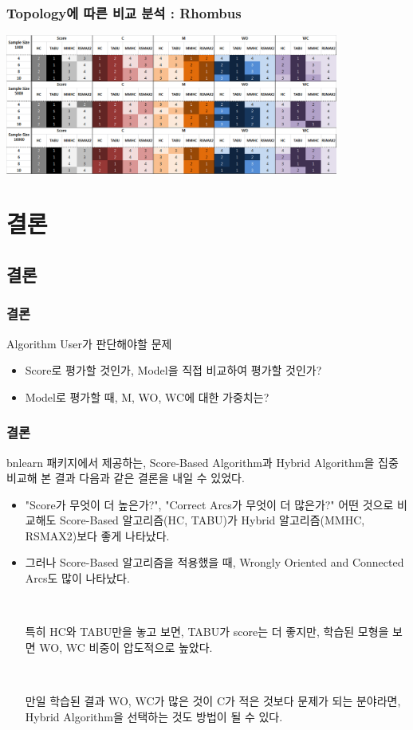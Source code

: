 \documentclass{beamer}
\begin{document}
\begin{frame}
\frametitle{Topology에 따른 비교 분석 : Rhombus}
{\scriptsize{}
	\begin{center}
		\includegraphics[height=130pt]{images/Result_Rhombus}
	\end{center}
}
\end{frame}


\section{결론}
\subsection{결론}
\begin{frame}
\frametitle{결론}
{\scriptsize{}
	Algorithm User가 판단해야할 문제	
	\begin{itemize}
		\item Score로 평가할 것인가, Model을 직접 비교하여 평가할 것인가?
		
		\item Model로 평가할 때, M, WO, WC에 대한 가중치는?
	\end{itemize}
}
\end{frame}


\begin{frame}
\frametitle{결론}
{\scriptsize{}
	bnlearn 패키지에서 제공하는, Score-Based Algorithm과 Hybrid Algorithm을 집중 비교해 본 결과 다음과 같은 결론을 내일 수 있었다.

	\begin{itemize}	
		\item "Score가 무엇이 더 높은가?", "Correct Arcs가 무엇이 더 많은가?" 어떤 것으로 비교해도 Score-Based 알고리즘(HC, TABU)가 Hybrid 알고리즘(MMHC, RSMAX2)보다 좋게 나타났다.
	
		\item 그러나 Score-Based 알고리즘을 적용했을 때, Wrongly Oriented and Connected Arcs도 많이 나타났다.
		
		{}\		
		
		특히 HC와 TABU만을 놓고 보면, TABU가 score는 더 좋지만, 학습된 모형을 보면 WO, WC 비중이 압도적으로 높았다.
		
		{}\		
		
		만일 학습된 결과 WO, WC가 많은 것이 C가 적은 것보다 문제가 되는 분야라면, Hybrid Algorithm을 선택하는 것도 방법이 될 수 있다.
	\end{itemize}	
}
\end{frame}
\end{document}
